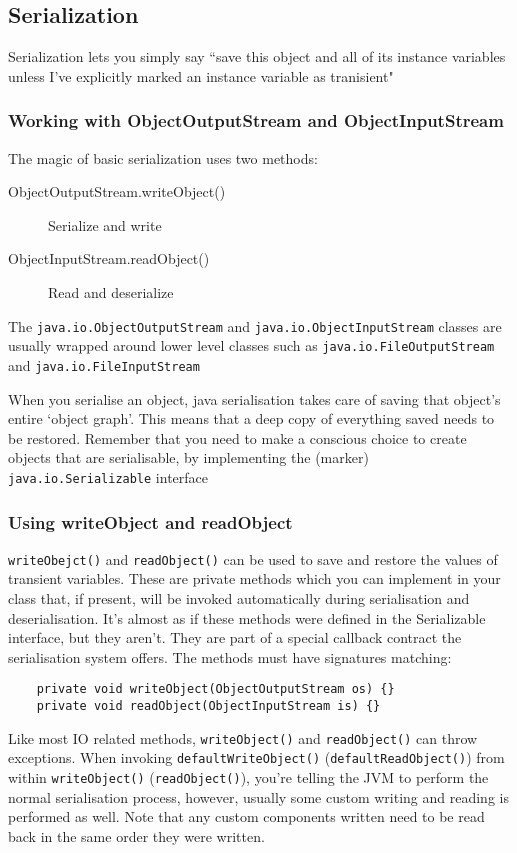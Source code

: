\subsection{Serialization}
Serialization lets you simply say ``save this object and all of its instance 
variables unless I've explicitly marked an instance variable as tranisient"

\subsubsection{Working with ObjectOutputStream and ObjectInputStream}
The magic of basic serialization uses two methods:
\begin{description}
    \item[ObjectOutputStream.writeObject()] Serialize and write
    \item[ObjectInputStream.readObject()] Read and deserialize
\end{description}
The \verb#java.io.ObjectOutputStream# and \verb#java.io.ObjectInputStream# 
classes are usually wrapped around lower level classes such as 
\verb#java.io.FileOutputStream# and \verb#java.io.FileInputStream#

When you serialise an object, java serialisation takes care of saving that 
object's entire `object graph'. This means that a deep copy of everything 
saved needs to be restored. Remember that you need to make a conscious choice 
to create objects that are serialisable, by implementing the (marker) 
\verb#java.io.Serializable# interface

\subsubsection{Using writeObject and readObject}
\verb#writeObejct()# and \verb#readObject()# can be used to save and restore 
the values of transient variables. These are private methods which you can 
implement in your class that, if present, will be invoked automatically during 
serialisation and deserialisation. It's almost as if these methods were defined 
in the Serializable interface, but they aren't. They are part of a special 
callback contract the serialisation system offers. The methods must have 
signatures matching:
\begin{verbatim}
    private void writeObject(ObjectOutputStream os) {}
    private void readObject(ObjectInputStream is) {}
\end{verbatim}
Like most IO related methods, \verb#writeObject()# and \verb#readObject()# can 
throw exceptions. When invoking \verb#defaultWriteObject()# 
(\verb#defaultReadObject()#) from within \verb#writeObject()# 
(\verb#readObject()#), you're telling the JVM to perform the normal 
serialisation process, however, usually some custom writing and reading is 
performed as well. Note that any custom components written need to be read back 
in the same order they were written.

